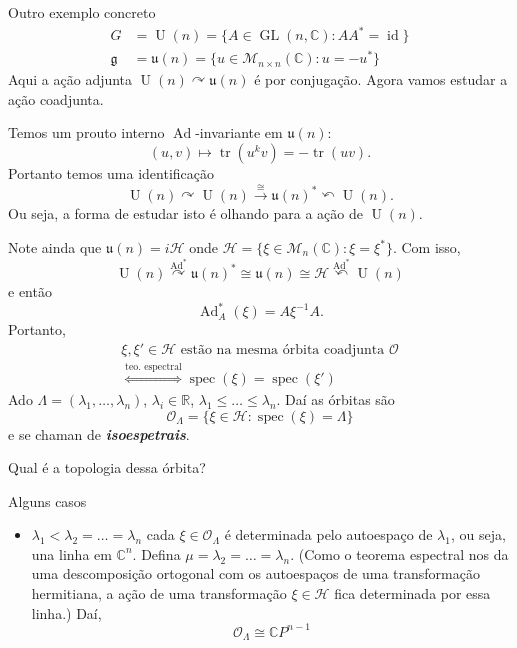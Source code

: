 \begin{thing6}{Outro exemplo concreto}\leavevmode
	\begin{align*}
		G&=\operatorname{U}(n) =\{A\in\operatorname{GL}(n,\mathbb{C}):A A^*=\operatorname{id}\} \\
		\mathfrak{g} &=\mathfrak{u}(n)=\{u\in\mathcal{M}_{n\times n}(\mathbb{C}):u=-u^*\}
	\end{align*}
	Aqui a ação adjunta $\operatorname{U}(n) \curvearrowright \mathfrak{u}(n)$ é por conjugação. Agora vamos estudar a ação coadjunta.

	Temos um prouto interno $\operatorname{Ad}$-invariante em $\mathfrak{u}(n)$:
	\[(u,v)\longmapsto \operatorname{tr}(u^kv)=-\operatorname{tr}(uv).\]
	Portanto temos uma identificação 
	\[\operatorname{U}(n) \curvearrowright \operatorname{U}(n) \xrightarrow{\cong }\mathfrak{u}(n)^*\curvearrowleft \operatorname{U}(n).\]
	Ou seja, a forma de estudar isto é olhando para a ação de $\operatorname{U}(n)$.

	Note ainda que $\mathfrak{u}(n) =i\mathcal{H}$ onde $\mathcal{H}=\{\xi \in\mathcal{M}_{n}(\mathbb{C}):\xi=\xi^*\}$. Com isso,
	\[\operatorname{U}(n) \overset{\operatorname{Ad}^*}{\curvearrowright}\mathfrak{u}(n)^*\cong \mathfrak{u}(n) \cong \mathcal{H}\overset{\operatorname{Ad}^*}{\curvearrowleft}\operatorname{U}(n)\]
	e então 
	\[\operatorname{Ad}_A^*(\xi)=A\xi^{-1}A.\]
	Portanto,
	\begin{align*}\xi,\xi'\in\mathcal{H}\text{ estão na mesma órbita coadjunta }\mathcal{O}\\
		\overset{\text{teo. espectral} }{\iff}  \operatorname{sp ec}(\xi)=\operatorname{s pec}(\xi')
		\end{align*}
		Ado $\Lambda=(\lambda_1,\ldots,\lambda_n)$, $\lambda_i\in\mathbb{R}$, $\lambda_1\leq \ldots \leq \lambda_n$. Daí as órbitas são
		\[\mathcal{O}_\Lambda=\{\xi \in\mathcal{H}:\operatorname{s pec}(\xi)=\Lambda\}\]
		e se chaman de \textit{\textbf{isoespetrais}}.

	{\color{5}Qual é a topologia dessa órbita?}
\begin{thing3}{Alguns casos}\leavevmode
	\begin{itemize}
	\item $\lambda_1<\lambda_2=\ldots =\lambda_n$ cada $\xi\in\mathcal{O}_\Lambda$ é determinada pelo autoespaço de $\lambda_1$, ou seja, una linha em $\mathbb{C}^{n}$. Defina $\mu=\lambda_2=\ldots =\lambda_n$. (Como o teorema espectral nos da uma descomposição ortogonal com os autoespaços de uma transformação hermitiana, a ação de uma transformação $\xi \in\mathcal{H}$ fica determinada por essa linha.) Daí,
		\[\mathcal{O}_\Lambda\cong \mathbb{C}P^{n-1}\]


\end{itemize}
\end{thing3}
\end{thing6}
